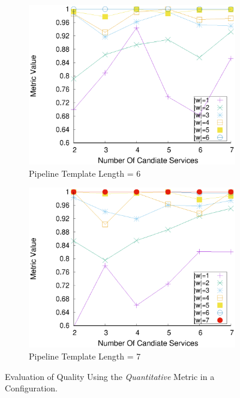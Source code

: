 \begin{figure}[ht!]
\begin{subfigure}{0.49\textwidth}
        \label{fig:quality_window_wide_perce_n5}
      \end{subfigure}
      \hfill
      \begin{subfigure}{0.49\textwidth}
        \includegraphics[width=\textwidth]{Images/graphs/window_quality_performance_diff_perce_n7_s7_20_100_n6}
        \caption{Pipeline Template Length = 6}
        \label{fig:quality_window_wide_perce_n6}
      \end{subfigure}
      \hfill
      \begin{subfigure}{0.49\textwidth}
        \includegraphics[width=\textwidth]{Images/graphs/window_quality_performance_diff_perce_n7_s7_20_100_n7}
        \caption{Pipeline Template Length = 7}
        \label{fig:quality_window_wide_perce_n7}
      \end{subfigure}

      \caption{Evaluation of Quality Using the \emph{Quantitative} Metric in a \wide Configuration.}
      \label{fig:quality_window_perce_wide}

    \end{figure}

